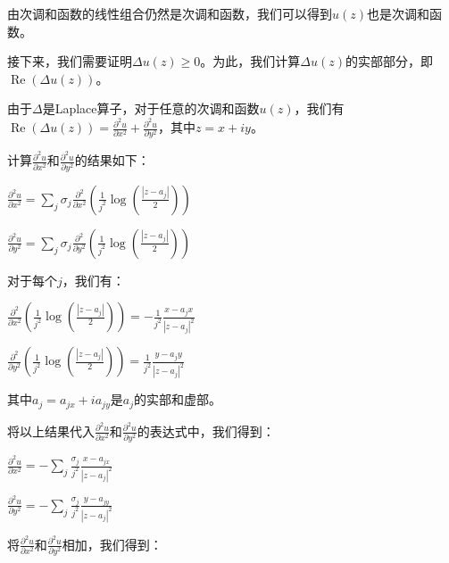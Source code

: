 \documentclass[12pt, a4paper, oneside]{ctexart}
\begin{document}
\begin{spacing}{2.0}
由次调和函数的线性组合仍然是次调和函数，我们可以得到$u(z)$也是次调和函数。

接下来，我们需要证明$\Delta u(z) \geq 0$。为此，我们计算$\Delta u(z)$的实部部分，即$\displaystyle \operatorname{Re}(\Delta u(z))$。

由于$\Delta$是Laplace算子，对于任意的次调和函数$u(z)$，我们有$\displaystyle \operatorname{Re}(\Delta u(z)) = \frac{\partial^2 u}{\partial x^2} + \frac{\partial^2 u}{\partial y^2}$，其中$z = x+iy$。

计算$\displaystyle \frac{\partial^2 u}{\partial x^2}$和$\displaystyle \frac{\partial^2 u}{\partial y^2}$的结果如下：
\begin{center}
    $\displaystyle \frac{\partial^2u}{\partial x^2}=\sum_j\sigma_j\frac{\partial^2}{\partial x^2}\left(\frac{1}{j^2}\log\left(\frac{|z-a_j|}{2}\right)\right)$
\end{center}

\begin{center}
    $\displaystyle \frac{\partial^2u}{\partial y^2}=\sum_j\sigma_j\frac{\partial^2}{\partial y^2}\left(\frac{1}{j^2}\log\left(\frac{|z-a_j|}{2}\right)\right)$
\end{center}
对于每个$j$，我们有：
\begin{center}
    $\displaystyle \frac{\partial^2}{\partial x^2}\left(\frac{1}{j^2}\log\left(\frac{|z-a_j|}{2}\right)\right)=-\frac{1}{j^2}\frac{x-a_jx}{|z-a_j|^2}$
\end{center}
\begin{center}
    $\displaystyle \frac{\partial^2}{\partial y^2}\left(\frac{1}{j^2}\log\left(\frac{|z-a_j|}{2}\right)\right)=\frac{1}{j^2}\frac{y-a_j y}{|z-a_j|^2}$

\end{center}
其中$\displaystyle a_j = a_{jx}+ia_{jy}$是$a_j$的实部和虚部。

将以上结果代入$\displaystyle \frac{\partial^2 u}{\partial x^2}$和$\displaystyle \frac{\partial^2 u}{\partial y^2}$的表达式中，我们得到：
\begin{center}
    $\displaystyle \frac{\partial^2u}{\partial x^2} = -\sum_j\frac{\sigma_j}{j^2}\frac{x-a_{jx}}{|z-a_j|^2}$
\end{center}

\begin{center}
    $\displaystyle \frac{\partial^2u}{\partial y^2} = -\sum_j\frac{\sigma_j}{j^2}\frac{y-a_{jy}}{|z-a_j|^2}$
\end{center}
将$\displaystyle \frac{\partial^2 u}{\partial x^2}$和$\displaystyle \frac{\partial^2 u}{\partial y^2}$相加，我们得到：


\end{spacing}
\end{document}
